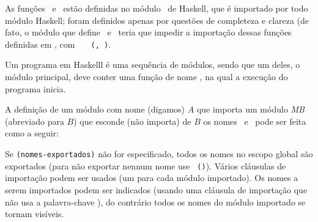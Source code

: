 \item As funções \elem\ e \delete\ estão definidas no módulo
  \Prelude\ de Haskell, que é importado por todo módulo Haskell; foram
  definidos apenas por questões de completeza e clareza (de fato, o
  módulo que define \elem\ e \delete\ teria que impedir a importação
  dessas funções definidas em \Prelude, com {\tt
    \ \Prelude\ \hiding (\elem, \delete)}.

  Um programa em Haskelll é uma sequência de módulos, sendo que um
  deles, o módulo principal, deve conter uma função de nome \main, na
  qual a execução do programa inicia.

  A definição de um módulo com nome (digamos) $A$ que importa um
  módulo {\it MB\/} (abreviado para $B$) que esconde (não importa) de
  $B$ os nomes \elem\ e \delete\ pode ser feita como a seguir: 


  Se {\tt (nomes-exportados)} não for especificado, todos os nomes no
  escopo global são exportados (para não exportar nennum nome use {\tt
    ()}). Vários cláusulas de importação podem ser usados (um para
  cada módulo importado). Os nomes a serem importados podem ser
  indicados (usando uma cláusula de importação que não usa a
  palavra-chave \hiding), do contrário todos os nomes do módulo
  importado se tornam visíveis.
